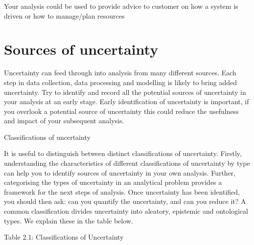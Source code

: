 \documentclass[]{book}
\begin{document}
 Your analysis could be used to provide advice to customer on how a
system is driven or how to manage/plan resources

\chapter{Sources of uncertainty}\label{sources-of-uncertainty}

 Uncertainty can feed through into analysis from many different sources.
Each step in data collection, data processing and modelling is likely to
bring added uncertainty. Try to identify and record all the potential
sources of uncertainty in your analysis at an early stage. Early
identification of uncertainty is important, if you overlook a potential
source of uncertainty this could reduce the usefulness and impact of
your subsequent analysis.

Classifications of uncertainty

 It is useful to distinguish between distinct classifications of
uncertainty. Firstly, understanding the characteristics of different
classifications of uncertainty by type can help you to identify sources
of uncertainty in your own analysis. Further, categorising the types of
uncertainty in an analytical problem provides a framework for the next
steps of analysis. Once uncertainty has been identified, you should then
ask: can you quantify the uncertainty, and can you reduce it? A common
classification divides uncertainty into aleatory, epistemic and
ontological types. We explain these in the table below.

Table 2.1: Classifications of Uncertainty
\end{document}
